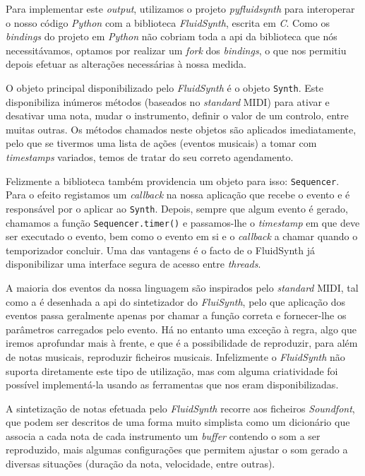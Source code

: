 Para implementar este \textit{output}, utilizamos o projeto \textit{pyfluidsynth}\citep{pyfluidsynth} para interoperar o nosso código \textit{Python} com a biblioteca \textit{FluidSynth}, escrita em \textit{C}. Como os \textit{bindings} do projeto em \textit{Python} não cobriam toda a \acrshort{api} da biblioteca que nós necessitávamos, optamos por realizar um \textit{fork} dos \textit{bindings}, o que nos permitiu depois efetuar as alterações necessárias à nossa medida.

O objeto principal disponibilizado pelo \textit{FluidSynth} é o objeto \texttt{Synth}. Este disponibiliza inúmeros métodos (baseados no \textit{standard} MIDI) para ativar e desativar uma nota, mudar o instrumento, definir o valor de um controlo, entre muitas outras. Os métodos chamados neste objetos são aplicados imediatamente, pelo que se tivermos uma lista de ações (eventos musicais) a tomar com \textit{timestamps} variados, temos de tratar do seu correto agendamento.

Felizmente a biblioteca também providencia um objeto para isso: \texttt{Sequencer}.  Para o efeito registamos um \textit{callback} na nossa aplicação que recebe o evento e é responsável por o aplicar ao \texttt{Synth}. Depois, sempre que algum evento é gerado, chamamos a função \texttt{Sequencer.timer()} e passamos-lhe o \textit{timestamp} em que deve ser executado o evento, bem como o evento em si e o \textit{callback} a chamar quando o temporizador concluir. Uma das vantagens é o facto de o FluidSynth já disponibilizar uma interface segura de acesso entre \textit{threads}\citep{henningsson2011fluidsynth}.

A maioria dos eventos da nossa linguagem são inspirados pelo \textit{standard} MIDI, tal como a é desenhada a \acrshort{api} do sintetizador do \textit{FluiSynth}, pelo que aplicação dos eventos passa geralmente apenas por chamar a função correta e fornecer-lhe os parâmetros carregados pelo evento. Há no entanto uma exceção à regra, algo que iremos aprofundar mais à frente, e que é a possibilidade de reproduzir, para além de notas musicais, reproduzir ficheiros musicais. Infelizmente o \textit{FluidSynth} não suporta diretamente este tipo de utilização, mas com alguma criatividade foi possível implementá-la usando as ferramentas que nos eram disponibilizadas.

A sintetização de notas efetuada pelo \textit{FluidSynth} recorre aos ficheiros \textit{Soundfont}, que podem ser descritos de uma forma muito simplista como um dicionário que associa a cada nota de cada instrumento um \textit{buffer} contendo o som a ser reproduzido, mais algumas configurações que permitem ajustar o som gerado a diversas situações (duração da nota, velocidade, entre outras).

